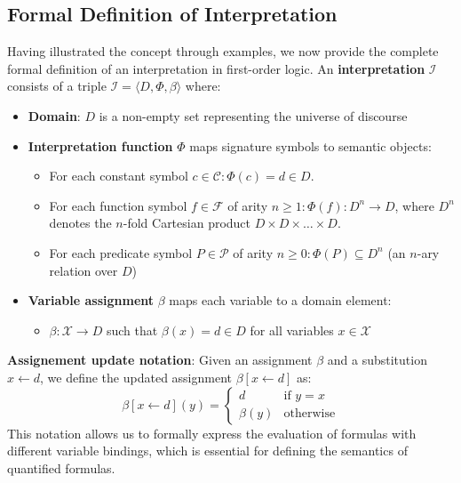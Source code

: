 \documentclass[a4paper]{article}
\theoremstyle{definition}
\begin{document}
\subsection{Formal Definition of Interpretation}
Having illustrated the concept through examples, we now provide the complete formal definition 
of an interpretation in first-order logic.
\vspace{1em}
\noindent
\newline
An \textbf{interpretation} \( \mathcal{I} \) consists of a triple \( \mathcal{I} = \langle D, \Phi, \beta \rangle \) where:
\begin{itemize}
	\item \textbf{Domain}: \( D \) is a non-empty set representing the universe of discourse 
	\item \textbf{Interpretation function} \( \Phi \) maps signature symbols to semantic objects:
	\begin{itemize}
		\item For each constant symbol \( c \in \mathcal{C}: \Phi(c) = d \in D \).
		\item For each function symbol \( f \in \mathcal{F} \) of arity \( n \geq 1: \Phi(f) : D^n \rightarrow D \), where \( D^n \) denotes the \( n \)-fold Cartesian product \( D \times D \times \ldots \times D \).
		\item For each predicate symbol \( P \in \mathcal{P} \) of arity \( n \geq 0: \Phi(P) \subseteq D^n \) (an \( n \)-ary relation over \( D \)) 		
	\end{itemize}
	\item \textbf{Variable assignment} \( \beta \) maps each variable to a domain element:
	\begin{itemize}
		\item \( \beta : \mathcal{X} \rightarrow D \) such that \( \beta(x) = d \in D \) for all variables \( x \in \mathcal{X} \)
	\end{itemize}
\end{itemize}
\textbf{Assignement update notation}: Given an assignment \( \beta \) and a substitution \( x \leftarrow d \), we define 
the updated assignment \( \beta[x \leftarrow d] \) as:
\[
  \beta[x \leftarrow d](y) = \begin{cases}
	d & \text{if } y = x \\
	\beta(y) & \text{otherwise}
  \end{cases}
\]
This notation allows us to formally express the evaluation of formulas with different variable bindings, 
which is essential for defining the semantics of quantified formulas.
\end{document}
